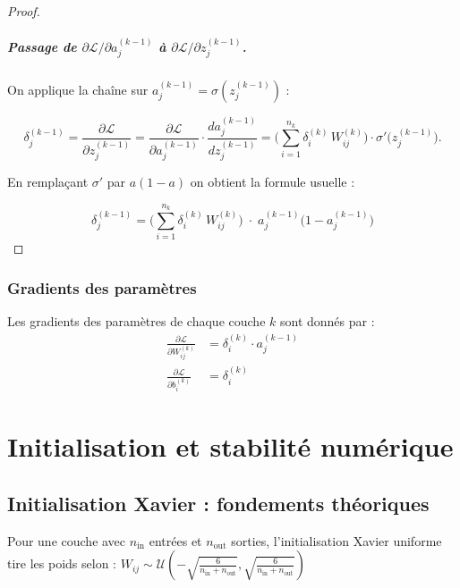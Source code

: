 \documentclass[12pt,a4paper]{report}
\numberwithin{equation}{section}
\begin{document}
\begin{proof}
\bigskip

\paragraph{Passage de \(\partial\mathcal{L}/\partial a^{(k-1)}_j\) à \(\partial\mathcal{L}/\partial z^{(k-1)}_j\).}
On applique la chaîne sur \(a^{(k-1)}_j = \sigma(z^{(k-1)}_j)\) :

$$\delta^{(k-1)}_j
= \frac{\partial \mathcal{L}}{\partial z^{(k-1)}_j}
= \frac{\partial \mathcal{L}}{\partial a^{(k-1)}_j}
  \cdot \frac{d a^{(k-1)}_j}{d z^{(k-1)}_j}
= \Big(\sum_{i=1}^{n_k} \delta^{(k)}_i \, W^{(k)}_{ij}\Big)
  \cdot \sigma'\bigl(z^{(k-1)}_j\bigr).$$

En remplaçant \(\sigma'\) par \(a(1-a)\) on obtient la formule usuelle :

$$\boxed{\;
\delta^{(k-1)}_j
= \Big(\sum_{i=1}^{n_k} \delta^{(k)}_i \, W^{(k)}_{ij}\Big)
\; \cdot\; a^{(k-1)}_j\bigl(1-a^{(k-1)}_j\bigr)
\;}$$

\end{proof}

\subsection{Gradients des paramètres}

\begin{theorem}
Les gradients des paramètres de chaque couche $k$ sont donnés par :
\begin{align}
\frac{\partial \mathcal{L}}{\partial W^{(k)}_{ij}} &= \delta^{(k)}_i \cdot a^{(k-1)}_j \label{eq:grad_weights}\\
\frac{\partial \mathcal{L}}{\partial b^{(k)}_i} &= \delta^{(k)}_i \label{eq:grad_bias}
\end{align}
\end{theorem}

\chapter{Initialisation et stabilité numérique}

\section{Initialisation Xavier : fondements théoriques}

\begin{theorem}
Pour une couche avec $n_{\text{in}}$ entrées et $n_{\text{out}}$ sorties, l'initialisation Xavier uniforme tire les poids selon :
$W_{ij} \sim \mathcal{U}\left(-\sqrt{\frac{6}{n_{\text{in}} + n_{\text{out}}}}, \sqrt{\frac{6}{n_{\text{in}} + n_{\text{out}}}}\right)$
\end{theorem}
\end{document}
